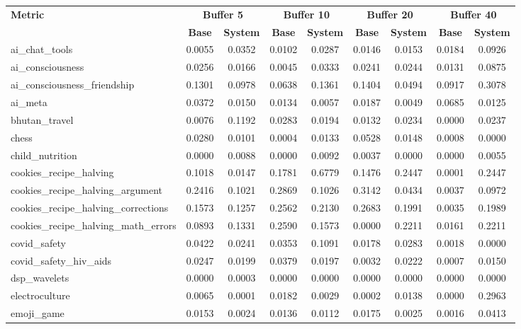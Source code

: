 \documentclass[pdflatex,sn-mathphys-num]{sn-jnl}%
\theoremstyle{thmstyleone}%
\theoremstyle{thmstyletwo}%
\theoremstyle{thmstylethree}%
\begin{document}
\begin{appendices}
\begin{landscape}
\begin{longtable}{@{}p{3.8cm}cccccccc@{}}
\toprule
\textbf{Metric} & \multicolumn{2}{c}{\textbf{Buffer 5}} & \multicolumn{2}{c}{\textbf{Buffer 10}} & \multicolumn{2}{c}{\textbf{Buffer 20}} & \multicolumn{2}{c}{\textbf{Buffer 40}} \\
\cmidrule(lr){2-3}\cmidrule(lr){4-5}\cmidrule(lr){6-7}\cmidrule(lr){8-9}
 & \textbf{Base} & \textbf{System} & \textbf{Base} & \textbf{System} & \textbf{Base} & \textbf{System} & \textbf{Base} & \textbf{System} \\
\midrule
\endhead
ai\_chat\_tools & 0.0055 & 0.0352 & 0.0102 & 0.0287 & 0.0146 & 0.0153 & 0.0184 & 0.0926 \\
ai\_consciousness & 0.0256 & 0.0166 & 0.0045 & 0.0333 & 0.0241 & 0.0244 & 0.0131 & 0.0875 \\
ai\_consciousness\_friendship & 0.1301 & 0.0978 & 0.0638 & 0.1361 & 0.1404 & 0.0494 & 0.0917 & 0.3078 \\
ai\_meta & 0.0372 & 0.0150 & 0.0134 & 0.0057 & 0.0187 & 0.0049 & 0.0685 & 0.0125 \\
bhutan\_travel & 0.0076 & 0.1192 & 0.0283 & 0.0194 & 0.0132 & 0.0234 & 0.0000 & 0.0237 \\
chess & 0.0280 & 0.0101 & 0.0004 & 0.0133 & 0.0528 & 0.0148 & 0.0008 & 0.0000 \\
child\_nutrition & 0.0000 & 0.0088 & 0.0000 & 0.0092 & 0.0037 & 0.0000 & 0.0000 & 0.0055 \\
cookies\_recipe\_halving & 0.1018 & 0.0147 & 0.1781 & 0.6779 & 0.1476 & 0.2447 & 0.0001 & 0.2447 \\
cookies\_recipe\_halving\_argument & 0.2416 & 0.1021 & 0.2869 & 0.1026 & 0.3142 & 0.0434 & 0.0037 & 0.0972 \\
cookies\_recipe\_halving\_corrections & 0.1573 & 0.1257 & 0.2562 & 0.2130 & 0.2683 & 0.1991 & 0.0035 & 0.1989 \\
cookies\_recipe\_halving\_math\_errors & 0.0893 & 0.1331 & 0.2590 & 0.1573 & 0.0000 & 0.2211 & 0.0161 & 0.2211 \\
covid\_safety & 0.0422 & 0.0241 & 0.0353 & 0.1091 & 0.0178 & 0.0283 & 0.0018 & 0.0000 \\
covid\_safety\_hiv\_aids & 0.0247 & 0.0199 & 0.0379 & 0.0197 & 0.0032 & 0.0222 & 0.0007 & 0.0150 \\
dsp\_wavelets & 0.0000 & 0.0003 & 0.0000 & 0.0000 & 0.0000 & 0.0000 & 0.0000 & 0.0000 \\
electroculture & 0.0065 & 0.0001 & 0.0182 & 0.0029 & 0.0002 & 0.0138 & 0.0000 & 0.2963 \\
emoji\_game & 0.0153 & 0.0024 & 0.0136 & 0.0112 & 0.0175 & 0.0025 & 0.0016 & 0.0413 \\

\end{longtable}
\end{landscape}
\end{appendices}
\end{document}
